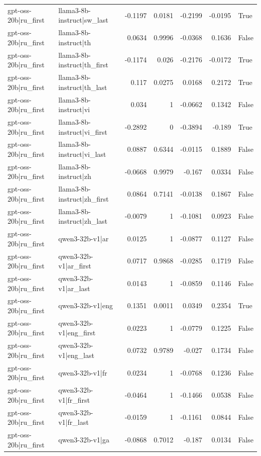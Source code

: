 \begin{table}
\begin{tabular}{l l r r r r l}
gpt-oss-20b|ru_first & llama3-8b-instruct|sw_last & -0.1197 & 0.0181 & -0.2199 & -0.0195 & True \\
gpt-oss-20b|ru_first & llama3-8b-instruct|th & 0.0634 & 0.9996 & -0.0368 & 0.1636 & False \\
gpt-oss-20b|ru_first & llama3-8b-instruct|th_first & -0.1174 & 0.026 & -0.2176 & -0.0172 & True \\
gpt-oss-20b|ru_first & llama3-8b-instruct|th_last & 0.117 & 0.0275 & 0.0168 & 0.2172 & True \\
gpt-oss-20b|ru_first & llama3-8b-instruct|vi & 0.034 & 1 & -0.0662 & 0.1342 & False \\
gpt-oss-20b|ru_first & llama3-8b-instruct|vi_first & -0.2892 & 0 & -0.3894 & -0.189 & True \\
gpt-oss-20b|ru_first & llama3-8b-instruct|vi_last & 0.0887 & 0.6344 & -0.0115 & 0.1889 & False \\
gpt-oss-20b|ru_first & llama3-8b-instruct|zh & -0.0668 & 0.9979 & -0.167 & 0.0334 & False \\
gpt-oss-20b|ru_first & llama3-8b-instruct|zh_first & 0.0864 & 0.7141 & -0.0138 & 0.1867 & False \\
gpt-oss-20b|ru_first & llama3-8b-instruct|zh_last & -0.0079 & 1 & -0.1081 & 0.0923 & False \\
gpt-oss-20b|ru_first & qwen3-32b-v1|ar & 0.0125 & 1 & -0.0877 & 0.1127 & False \\
gpt-oss-20b|ru_first & qwen3-32b-v1|ar_first & 0.0717 & 0.9868 & -0.0285 & 0.1719 & False \\
gpt-oss-20b|ru_first & qwen3-32b-v1|ar_last & 0.0143 & 1 & -0.0859 & 0.1146 & False \\
gpt-oss-20b|ru_first & qwen3-32b-v1|eng & 0.1351 & 0.0011 & 0.0349 & 0.2354 & True \\
gpt-oss-20b|ru_first & qwen3-32b-v1|eng_first & 0.0223 & 1 & -0.0779 & 0.1225 & False \\
gpt-oss-20b|ru_first & qwen3-32b-v1|eng_last & 0.0732 & 0.9789 & -0.027 & 0.1734 & False \\
gpt-oss-20b|ru_first & qwen3-32b-v1|fr & 0.0234 & 1 & -0.0768 & 0.1236 & False \\
gpt-oss-20b|ru_first & qwen3-32b-v1|fr_first & -0.0464 & 1 & -0.1466 & 0.0538 & False \\
gpt-oss-20b|ru_first & qwen3-32b-v1|fr_last & -0.0159 & 1 & -0.1161 & 0.0844 & False \\
gpt-oss-20b|ru_first & qwen3-32b-v1|ga & -0.0868 & 0.7012 & -0.187 & 0.0134 & False \\

\end{tabular}
\end{table}
